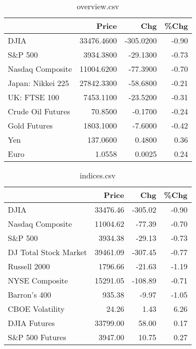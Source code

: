 \documentclass{article}%
\begin{document}
\begin{table}[htbp]%
\caption{overview.csv}%
\centering%
\begin{adjustbox}{width=1\textwidth}%
\begin{tabular}{lrrr}
\toprule
                  &      Price &       Chg &  \%Chg \\
\midrule
             DJIA & 33476.4600 & -305.0200 & -0.90 \\
          S\&P 500 &  3934.3800 &  -29.1300 & -0.73 \\
 Nasdaq Composite & 11004.6200 &  -77.3900 & -0.70 \\
Japan: Nikkei 225 & 27842.3300 &  -58.6800 & -0.21 \\
     UK: FTSE 100 &  7453.1100 &  -23.5200 & -0.31 \\
Crude Oil Futures &    70.8500 &   -0.1700 & -0.24 \\
     Gold Futures &  1803.1000 &   -7.6000 & -0.42 \\
              Yen &   137.0600 &    0.4800 &  0.36 \\
             Euro &     1.0558 &    0.0025 &  0.24 \\
\bottomrule
\end{tabular}
%
\end{adjustbox}%
\end{table}

%


\begin{table}[htbp]%
\caption{indices.csv}%
\centering%
\begin{adjustbox}{width=1\textwidth}%
\begin{tabular}{lrrr}
\toprule
                      &    Price &     Chg &  \%Chg \\
\midrule
                 DJIA & 33476.46 & -305.02 & -0.90 \\
     Nasdaq Composite & 11004.62 &  -77.39 & -0.70 \\
              S\&P 500 &  3934.38 &  -29.13 & -0.73 \\
DJ Total Stock Market & 39461.09 & -307.45 & -0.77 \\
         Russell 2000 &  1796.66 &  -21.63 & -1.19 \\
       NYSE Composite & 15291.05 & -108.89 & -0.71 \\
         Barron's 400 &   935.38 &   -9.97 & -1.05 \\
      CBOE Volatility &    24.26 &    1.43 &  6.26 \\
         DJIA Futures & 33799.00 &   58.00 &  0.17 \\
      S\&P 500 Futures &  3947.00 &   10.75 &  0.27 \\
\bottomrule
\end{tabular}
%
\end{adjustbox}%
\end{table}
\end{document}
